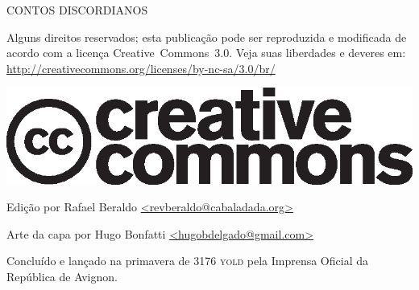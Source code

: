 \thispagestyle{empty}
\begin{center}
{\tiny
CONTOS DISCORDIANOS

\vspace{.5cm}

\begin{minipage}[h]{.6\textwidth}
Alguns direitos reservados; esta publicação pode ser reproduzida e modificada de acordo com a licença \foreignlanguage{english}{Creative~Commons~3.0}. Veja suas liberdades e deveres em: \url{http://creativecommons.org/licenses/by-nc-sa/3.0/br/}
	\begin{center}
	\includegraphics[scale=.2]{cc.eps}
	\end{center}
\end{minipage}

\vspace{.5cm}

\begin{minipage}[h]{.6\textwidth}
Edição por Rafael Beraldo \url{<revberaldo@cabaladada.org>}

Arte da capa por Hugo Bonfatti \url{<hugobdelgado@gmail.com>}
\end{minipage}

\vfill

\begin{minipage}[h]{.6\textwidth}
\centering
Concluído e lançado na primavera de 3176 \textsc{yold} pela Imprensa Oficial da República de Avignon.
\end{minipage}
}
\end{center}
\newpage

